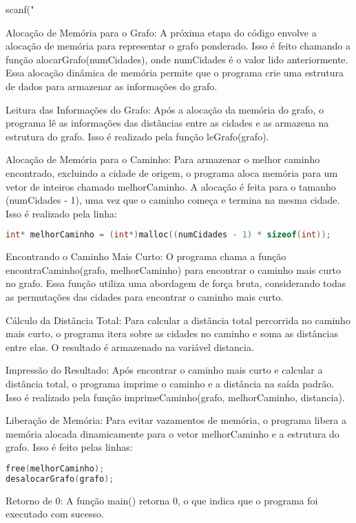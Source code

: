 \documentclass[12pt]{spieman}
\begin{document}
scanf("%

Alocação de Memória para o Grafo: A próxima etapa do código envolve a alocação de memória para representar o grafo ponderado. Isso é feito chamando a função alocarGrafo(numCidades), onde numCidades é o valor lido anteriormente. Essa alocação dinâmica de memória permite que o programa crie uma estrutura de dados para armazenar as informações do grafo.

Leitura das Informações do Grafo: Após a alocação da memória do grafo, o programa lê as informações das distâncias entre as cidades e as armazena na estrutura do grafo. Isso é realizado pela função leGrafo(grafo).

Alocação de Memória para o Caminho: Para armazenar o melhor caminho encontrado, excluindo a cidade de origem, o programa aloca memória para um vetor de inteiros chamado melhorCaminho. A alocação é feita para o tamanho (numCidades - 1), uma vez que o caminho começa e termina na mesma cidade. Isso é realizado pela linha:
\begin{lstlisting}[language=C]
int* melhorCaminho = (int*)malloc((numCidades - 1) * sizeof(int));
\end{lstlisting}
Encontrando o Caminho Mais Curto: O programa chama a função encontraCaminho(grafo, melhorCaminho) para encontrar o caminho mais curto no grafo. Essa função utiliza uma abordagem de força bruta, considerando todas as permutações das cidades para encontrar o caminho mais curto.

Cálculo da Distância Total: Para calcular a distância total percorrida no caminho mais curto, o programa itera sobre as cidades no caminho e soma as distâncias entre elas. O resultado é armazenado na variável distancia.

Impressão do Resultado: Após encontrar o caminho mais curto e calcular a distância total, o programa imprime o caminho e a distância na saída padrão. Isso é realizado pela função imprimeCaminho(grafo, melhorCaminho, distancia).

Liberação de Memória: Para evitar vazamentos de memória, o programa libera a memória alocada dinamicamente para o vetor melhorCaminho e a estrutura do grafo. Isso é feito pelas linhas:
\begin{lstlisting}[language=C]
free(melhorCaminho);
desalocarGrafo(grafo);
\end{lstlisting}
Retorno de 0: A função main() retorna 0, o que indica que o programa foi executado com sucesso.
\end{document}
